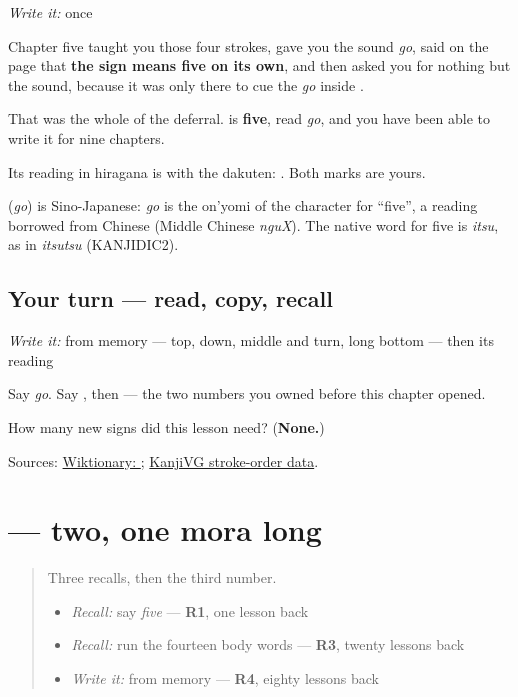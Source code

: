 \emph{Write it:} \textbf{} once

Chapter five taught you those four strokes, gave you the sound \emph{go}, said on the page that \textbf{the sign means five on its own}, and then asked you for nothing but the sound, because it was only there to cue the \emph{go} inside \textbf{}.

That was the whole of the deferral. \textbf{} is \textbf{five}, read \emph{go}, and you have been able to write it for nine chapters.

Its reading in hiragana is \textbf{} with the dakuten: \textbf{}. Both marks are yours.

\begin{cousinweb}
\textbf{} (\emph{go}) is Sino-Japanese: \emph{go} is the on'yomi of the character for \textquotedblleft{}five\textquotedblright{}, a reading borrowed from Chinese (Middle Chinese \emph{nguX}). The native word for five is \emph{itsu}, as in \emph{itsutsu} (KANJIDIC2).
\end{cousinweb}

\subsection*{Your turn — read, copy, recall}
\emph{Write it:} \textbf{} from memory — top, down, middle and turn, long bottom — then its reading \textbf{}

Say \emph{go}. Say \textbf{}, then \textbf{} — the two numbers you owned before this chapter opened.

\begin{tcolorbox}[breakable,colback=teal!4,colframe=teal!35!black,title={Before you move on}]
How many new signs did this lesson need? (\textbf{None.})

Sources: \href{https://en.wiktionary.org/wiki/\%E4\%BA\%94}{Wiktionary: }; \href{https://kanjivg.tagaini.net/kanjivg/kanji/04e94.html}{KanjiVG stroke-order data}.
\end{tcolorbox}
\section[\texorpdfstring{\ja{に} (ni)}{に (ni)}]{ — two, one mora long}

\label{lesson:JA-C14-ni}



\begin{quote}
Three recalls, then the third number.

\begin{itemize}
\raggedright
  \item \emph{Recall:} say \emph{five} — \textbf{R1}, one lesson back
  \item \emph{Recall:} run the fourteen body words — \textbf{R3}, twenty lessons back
  \item \emph{Write it:} \textbf{} from memory — \textbf{R4}, eighty lessons back
\end{itemize}
\end{quote}

